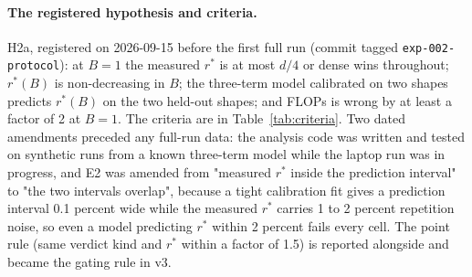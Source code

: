 \documentclass{article}
\newcommand{\rstar}{r^{*}}
\begin{document}
\paragraph{The registered hypothesis and criteria.} H2a, registered on 2026-09-15 before the first full run (commit tagged \texttt{exp-002-protocol}): at $B = 1$ the measured $\rstar$ is at most $d/4$ or dense wins throughout; $\rstar(B)$ is non-decreasing in $B$; the three-term model calibrated on two shapes predicts $\rstar(B)$ on the two held-out shapes; and FLOPs is wrong by at least a factor of 2 at $B = 1$. The criteria are in Table~\ref{tab:criteria}. Two dated amendments preceded any full-run data: the analysis code was written and tested on synthetic runs from a known three-term model while the laptop run was in progress, and E2 was amended from "measured $\rstar$ inside the prediction interval" to "the two intervals overlap", because a tight calibration fit gives a prediction interval 0.1 percent wide while the measured $\rstar$ carries 1 to 2 percent repetition noise, so even a model predicting $\rstar$ within 2 percent fails every cell. The point rule (same verdict kind and $\rstar$ within a factor of 1.5) is reported alongside and became the gating rule in v3.
\end{document}
